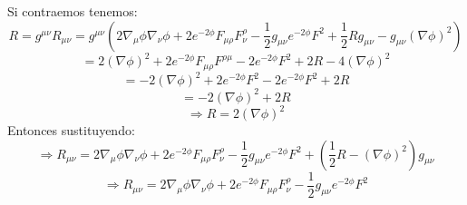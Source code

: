 \documentclass[10pt,a4paper]{article}
\begin{document}
Si contraemos tenemos:
$$R = g^{\mu \nu}R_{\mu \nu} = g^{\mu \nu}(2\nabla_\mu \phi \nabla_\nu \phi+ 2e^{-2 \phi} F_{\mu \rho} F^{\rho}_{\nu} - \frac{1}{2}  g_{\mu \nu}e^{-2 \phi}F^2 + \frac{1}{2}Rg_{\mu\nu} - g_{\mu\nu} (\nabla \phi)^2)$$
$$=2(\nabla \phi)^2 + 2e^{-2 \phi} F_{\mu \rho} F^{\rho \mu}-2e^{-2 \phi}F^2 + 2R - 4(\nabla \phi)^2$$
$$=-2(\nabla \phi)^2 + 2e^{-2 \phi}  F^2 - 2e^{-2 \phi}F^2 + 2R$$
$$=-2(\nabla \phi)^2 + 2R$$
$$\Rightarrow R = 2(\nabla \phi)^2$$
Entonces sustituyendo:
$$\Rightarrow R_{\mu \nu} = 2\nabla_\mu \phi \nabla_\nu \phi+ 2e^{-2 \phi} F_{\mu \rho} F^{\rho}_{\nu} - \frac{1}{2}  g_{\mu \nu}e^{-2 \phi}F^2 + (\frac{1}{2}R - (\nabla \phi)^2)g_{\mu\nu}$$
$$\Rightarrow R_{\mu \nu} = 2\nabla_\mu \phi \nabla_\nu \phi+ 2e^{-2 \phi} F_{\mu \rho} F^{\rho}_{\nu} - \frac{1}{2}  g_{\mu \nu}e^{-2 \phi}F^2$$
\end{document}
